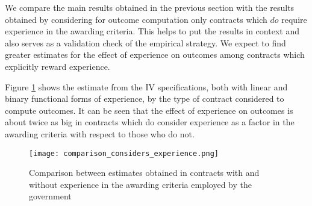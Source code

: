 We compare the main results obtained in the previous section with the results obtained by considering for outcome computation only contracts which $do$ require experience in the awarding criteria. This helps to put the results in context and also serves as a validation check of the empirical strategy. We expect to find greater estimates for the effect of experience on outcomes among contracts which explicitly reward experience.

Figure \ref{fig:comparison_considers_experience} shows the estimate from the IV specifications, both with linear and binary functional forms of experience, by the type of contract considered to compute outcomes. It can be seen that the effect of experience on outcomes is about twice as big in contracts which do consider experience as a factor in the awarding criteria with respect to those who do not.

\begin{figure}[H]
  \texttt{[image: comparison\_considers\_experience.png]}
  \caption{Comparison between estimates obtained in contracts with and without experience in the awarding criteria employed by the government}
  \label{fig:comparison_considers_experience}
\end{figure}




%


